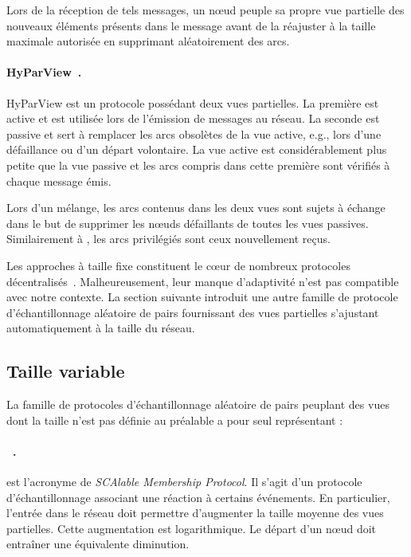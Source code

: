 \noindent Lors de la réception de tels messages, un nœud peuple sa propre vue
partielle des nouveaux éléments présents dans le message avant de la réajuster à
la taille maximale autorisée en supprimant aléatoirement des arcs.

\paragraph{HyParView~\cite{leitao2007dependable}.} HyParView est un protocole
possédant deux vues partielles. La première est active et est utilisée lors de
l'émission de messages au réseau. La seconde est passive et sert à remplacer les
arcs obsolètes de la vue active, e.g., lors d'une défaillance ou d'un départ
volontaire.  La vue active est considérablement plus petite que la vue passive
et les arcs compris dans cette première sont vérifiés à chaque message émis.

\noindent Lors d'un mélange, les arcs contenus dans les deux vues sont sujets à
échange dans le but de supprimer les nœuds défaillants de toutes les vues
passives. Similairement à \CYCLON, les arcs privilégiés sont ceux nouvellement
reçus.


Les approches à taille fixe constituent le cœur de nombreux protocoles
décentralisés~\cite{dabek2004vivaldi, folz2016cyclades, jelasity2009tman,
  krasikova2016distributed}. Malheureusement, leur manque d'adaptivité n'est pas
compatible avec notre contexte.
La section suivante introduit une autre famille de protocole d'échantillonnage
aléatoire de pairs fournissant des vues partielles s'ajustant automatiquement à
la taille du réseau.

\subsection{Taille variable}
\label{net:subsec:variable}

La famille de protocoles d'échantillonnage aléatoire de pairs peuplant des vues
dont la taille n'est pas définie au préalable a pour seul représentant :

\paragraph{\SCAMP~\cite{ganesh2001scamp, ganesh2003peer}.} \SCAMP est l'acronyme
de \emph{SCAlable Membership Protocol}. Il s'agit d'un protocole
d'échantillonnage associant une réaction à certains événements. En particulier,
l'entrée dans le réseau doit permettre d'augmenter la taille moyenne des vues
partielles. Cette augmentation est logarithmique. Le départ d'un nœud doit
entraîner une équivalente diminution.

